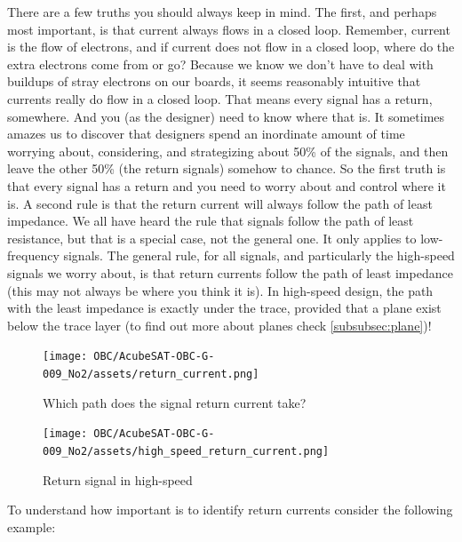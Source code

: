 \documentclass[final]{cubedoc}
\begin{document}
	There are a few truths you should always keep in mind. The first, and perhaps most important, is that current always flows in a closed loop. Remember, current is the flow of electrons, and if current does not flow in a closed loop, where do the extra electrons come from or go? Because we know we don't have to deal with buildups of stray electrons on our boards, it seems reasonably intuitive that currents really do flow in a closed loop. That means every signal has a return, somewhere. And you (as the designer) need to know where that is. It sometimes amazes us to discover that designers spend an inordinate amount of time worrying about, considering, and strategizing about 50\% of the signals, and then leave the other 50\% (the return signals) somehow to chance. So the first truth is that every signal has a return and you need to worry about and control where it is. A second rule is that the return current will always follow the path of least impedance. We all have heard the rule that signals follow the path of least resistance, but that is a special case, not the general one. It only applies to low-frequency signals. The general rule, for all signals, and particularly the high-speed signals we worry about, is that return currents follow the path of least impedance (this may not always be where you think it is). In high-speed design, the path with the least impedance is exactly under the trace, provided that a plane exist below the trace layer (to find out more about planes check \autoref{subsubsec:plane})!
	
	\begin{figure}[h!]
		\centering
		\texttt{[image: OBC/AcubeSAT-OBC-G-009\_No2/assets/return\_current.png]}
		\caption{Which path does the signal return current take?}
		\label{fig:my_label}
	\end{figure}{}
	
	\begin{figure}[h!]
		\centering
		\texttt{[image: OBC/AcubeSAT-OBC-G-009\_No2/assets/high\_speed\_return\_current.png]}
		\caption{Return signal in high-speed}
		\label{fig:my_label}
	\end{figure}
	
	To understand how important is to identify return currents consider the following example:
	
\end{document}
